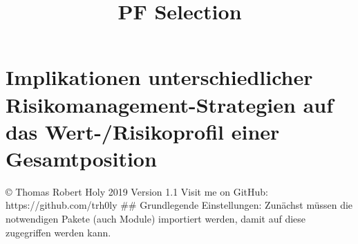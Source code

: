 \documentclass[paper=landscape]{scrartcl}
\title{PF Selection}
\begin{document}
    
    
    \maketitle
    
    

    
    \hypertarget{implikationen-unterschiedlicher-risikomanagement-strategien-auf-das-wert-risikoprofil-einer-gesamtposition}{%
\section{Implikationen unterschiedlicher Risikomanagement-Strategien auf
das Wert-/Risikoprofil einer
Gesamtposition}\label{implikationen-unterschiedlicher-risikomanagement-strategien-auf-das-wert-risikoprofil-einer-gesamtposition}}

© Thomas Robert Holy 2019 Version 1.1 Visit me on GitHub:
https://github.com/trh0ly \#\# Grundlegende Einstellungen: Zunächst
müssen die notwendigen Pakete (auch Module) importiert werden, damit auf
diese zugegriffen werden kann.
\end{document}
